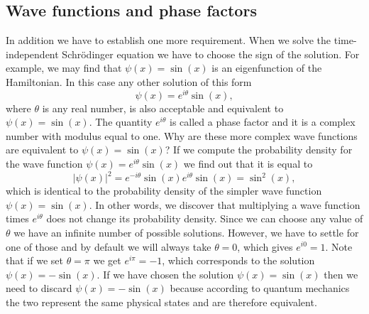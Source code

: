 \documentclass[../Main/chem331-notes.tex]{subfiles}
\begin{document}
\subsection{Wave functions and phase factors}
In addition we have to establish one more requirement.
When we solve the time-independent Schr\"{o}dinger equation we have to choose the sign of the solution.
For example, we may find that $\psi(x) = \sin(x)$ is an eigenfunction of the Hamiltonian. In this case any other solution of this form
\begin{equation}
\psi(x) = e^{i\theta} \sin(x),
\end{equation}
where $\theta$ is any real number,  is also acceptable and equivalent to $\psi(x) = \sin(x)$.
The quantity $e^{i\theta}$ is called a phase factor and it is a complex number with modulus equal to one.
Why are these more complex wave functions are equivalent to $\psi(x) = \sin(x)$?
If we compute the probability density for the wave function $\psi(x) = e^{i\theta} \sin(x)$ we find out that it is equal to
\begin{equation}
|\psi(x)|^2 = e^{-i\theta} \sin(x) e^{i\theta} \sin(x) = \sin^2(x),
\end{equation}
which is identical to the probability density of the simpler wave function $\psi(x) = \sin(x)$.
In other words, we discover that multiplying a wave function times $e^{i\theta}$ does not change its probability density.
Since we can choose any value of $\theta$ we have an infinite number of possible solutions.
However, we have to settle for one of those and by default we will always take $\theta = 0$, which gives $e^{i0} = 1$.
Note that if we set $\theta = \pi$ we get $e^{i\pi} = -1$, which corresponds to the solution $\psi(x) = -\sin(x)$.
If we have chosen the solution $\psi(x) = \sin(x)$ then we need to discard $\psi(x) = -\sin(x)$ because according to quantum mechanics  the two represent the same physical states and are therefore equivalent.
\end{document}
